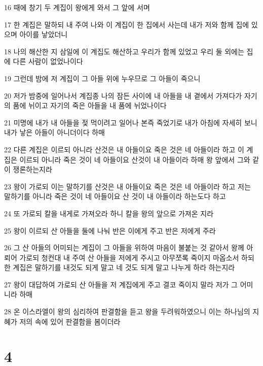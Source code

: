 \par 16 때에 창기 두 계집이 왕에게 와서 그 앞에 서며
\par 17 한 계집은 말하되 내 주여 나와 이 계집이 한 집에서 사는데 내가 저와 함께 집에 있으며 아이를 낳았더니
\par 18 나의 해산한 지 삼일에 이 계집도 해산하고 우리가 함께 있었고 우리 둘 외에는 집에 다른 사람이 없었나이다
\par 19 그런데 밤에 저 계집이 그 아들 위에 누우므로 그 아들이 죽으니
\par 20 저가 밤중에 일어나서 계집종 나의 잠든 사이에 내 아들을 내 곁에서 가져다가 자기의 품에 뉘이고 자기의 죽은 아들을 내 품에 뉘었나이다
\par 21 미명에 내가 내 아들을 젖 먹이려고 일어나 본즉 죽었기로 내가 아침에 자세히 보니 내가 낳은 아들이 아니더이다 하매
\par 22 다른 계집은 이르되 아니라 산것은 내 아들이요 죽은 것은 네 아들이라 하고 이 계집은 이르되 아니라 죽은 것이 네 아들이요 산것이 내 아들이라 하매 왕 앞에서 그와 같이 쟁론하는지라
\par 23 왕이 가로되 이는 말하기를 산것은 내 아들이요 죽은 것은 네 아들이라 하고 저는 말하기를 아니라 죽은 것이 네 아들이요 산 것이 내 아들이라 하는도다 하고
\par 24 또 가로되 칼을 내게로 가져오라 하니 칼을 왕의 앞으로 가져온 지라
\par 25 왕이 이르되 산 아들을 둘에 나눠 반은 이에게 주고 반은 저에게 주라
\par 26 그 산 아들의 어미되는 계집이 그 아들을 위하여 마음이 불붙는 것 같아서 왕께 아뢰어 가로되 청컨대 내 주여 산 아들을 저에게 주시고 아무쪼록 죽이지 마옵소서 하되 한 계집은 말하기를 내것도 되게 말고 네 것도 되게 말고 나누게 하라 하는지라
\par 27 왕이 대답하여 가로되 산 아들을 저 계집에게 주고 결코 죽이지 말라 저가 그 어미니라 하매
\par 28 온 이스라엘이 왕의 심리하여 판결함을 듣고 왕을 두려워하였으니 이는 하나님의 지혜가 저의 속에 있어 판결함을 봄이더라

\chapter{4}

